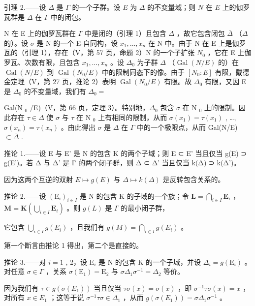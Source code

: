 引理 2.——设 \(\Delta\) 是 \(\Gamma\) 的一个子群。设 \(E\) 为 \(\Delta\) 的不变量域；则 \(N\) 在 \(E\) 上的伽罗瓦群是 \(\Delta\) 在 \(\Gamma\) 中的闭包。

N 在 E 上的伽罗瓦群在 \(\Gamma\) 中是闭的（引理 1）且包含 \(\Delta\) ，故它包含闭包 \(\bar{\Delta}\) （\(\Delta\) 的）。设 \(\sigma\) 是 N 的一个 E-自同构，设 \(x_{1}, \ldots, x_{n}\) 在 N 中。由于 N 在 E 上是伽罗瓦的（引理 1），存在（V，第 57 页，命题 2）N 的一个子扩张 \(N_{0}\) ，它在 E 上伽罗瓦、次数有限，且包含 \(x_{1}, \ldots, x_{n}\) 。设 \(\Delta_{0}\) 为子群 \(\Delta\) （\(\operatorname{Gal}(N/E)\) 的）在 \(\operatorname{Gal}(N/E)\) 到 \(\operatorname{Gal}(N_{0}/E)\) 中的限制同态下的像。由于 \([N_{0}:E]\) 有限，戴德金定理（V，第 27 页，推论 2）表明 \(\operatorname{Gal}(N_{0}/E)\) 有限。故 \(\Delta_{0}\) 有限，又因 E 是 \(\Delta_{0}\) 的不变量域，我们有 \(\Delta_{0}=\)

Gal(N \(_0\) /E)（V，第 66 页，定理 3）。特别地，\(\Delta_0\) 包含 \(\sigma\) 在 N \(_0\) 上的限制。因此存在 \(\tau \in \Delta\) 使 \(\sigma\) 与 \(\tau\) 在 N \(_0\) 上有相同的限制，从而 \(\sigma(x_1) = \tau(x_1)\) , \ldots, \(\sigma(x_n) = \tau(x_n)\) 。由此得出 \(\sigma\) 是 \(\Delta\) 在 \(\Gamma\) 中的一个极限点，从而 Gal(N/E) \(\subset \bar{\Delta}\) .

推论 1.——设 E 与 E' 是 N 的包含 K 的两个子域；则 E ⊂ E' 当且仅当 g(E) ⊃ g(E')。若 Δ 与 Δ' 是 Γ 的两个闭子群，则 Δ ⊂ Δ' 当且仅当 k(Δ) ⊃ k(Δ')。

因为这两个互逆的双射 \(E \mapsto g(E)\) 与 \(\Delta \mapsto k(\Delta)\) 是反转包含关系的。

推论 2.——设 \((\mathrm{E}_i)_{i\in I}\) 是 N 的包含 K 的子域的一个族；令 \(\mathbf{L} = \bigcap_{i\in I}\mathbf{E}_i\) ，\(\mathbf{M} = \mathbf{K}\left(\bigcup_{i\in I}\mathbf{E}_i\right)\) 。则 \(g(L)\) 是 \(\Gamma\) 的最小闭子群，

它包含 \(\bigcup_{i\in I}g(E_i)\) ，且我们有 \(g(M) = \bigcap_{i\in I}g(E_i)\) 。

第一个断言由推论 1 得出，第二个是直接的。

推论 3.——对 \(i=1\) , 2，设 \(\mathrm{E}_{i}\) 是 N 的包含 K 的一个子域，并设 \(\Delta_{i}=g(\mathrm{E}_{i})\) 。对任意 \(\sigma\in\Gamma\) ，关系 \(\sigma(\mathrm{E}_{1})=\mathrm{E}_{2}\) 与 \(\sigma\Delta_{1}\sigma^{-1}=\Delta_{2}\) 等价。

因为我们有 \(\tau \in g(\sigma(E_1))\) 当且仅当 \(\tau\sigma(x) = \sigma(x)\) ，即 \(\sigma^{-1}\tau\sigma(x) = x\) ，对所有 \(x \in E_1\) ；这等于说 \(\sigma^{-1}\tau\sigma \in \Delta_1\) ，从而 \(g(\sigma(E_1)) = \sigma\Delta_1\sigma^{-1}\) 。

